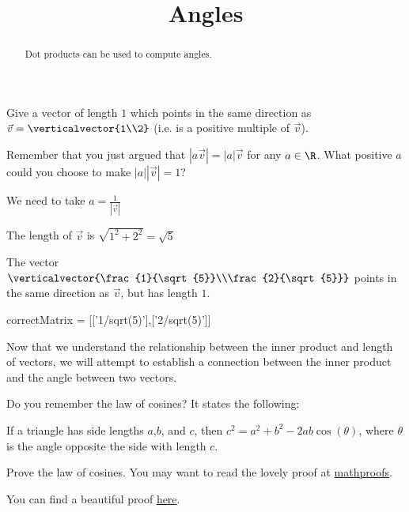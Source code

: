 \documentclass{ximera}
\title{Angles}
\begin{document}
\begin{abstract}
  Dot products can be used to compute angles.
\end{abstract}

\begin{question}
  Give a vector of length $1$ which points in the same direction as $\vec{v} = \verticalvector{1\\2}$ (i.e. is a positive multiple of $\vec{v}$). 
  \begin{solution}
    
    \begin{hint}
      Remember that you just argued that $|a\vec{v}| =|a|\vec{v}$ for any $a\in \R$.  What positive $a$ could you choose to make $|a||\vec{v}| = 1$?
    \end{hint}
    \begin{hint}
      We need to take $a = \frac{1}{|\vec{v}|}$
    \end{hint}
    \begin{hint}
      The length of $\vec{v}$ is $\sqrt{1^2+2^2} = \sqrt{5}$
    \end{hint}
    \begin{hint}
      The vector $\verticalvector{\frac{1}{\sqrt{5}}\\\frac{2}{\sqrt{5}}}$ points in the same direction as $\vec{v}$, but has length $1$.
    \end{hint}
    \begin{matrix-answer}
      correctMatrix = [['1/sqrt(5)'],['2/sqrt(5)']]
    \end{matrix-answer}
  \end{solution}
\end{question}	

Now that we understand the relationship between the inner product and
length of vectors, we will attempt to establish a connection between
the inner product and the angle between two vectors.

Do you remember the law of cosines?  It states the following:

\begin{theorem}
  If a triangle has side lengths $a$,$b$, and $c$, then $c^2 = a^2+b^2 - 2ab\cos(\theta)$, where $\theta$ is the angle opposite the side with length $c$.
\end{theorem}

Prove the law of cosines.  You may want to read the lovely proof at \href{http://mathproofs.blogspot.com/2006/06/law-of-cosines.html}{mathproofs}.
\begin{free-response}
  You can find a beautiful proof \href{http://mathproofs.blogspot.com/2006/06/law-of-cosines.html}{here}.
\end{free-response}
\end{document}
